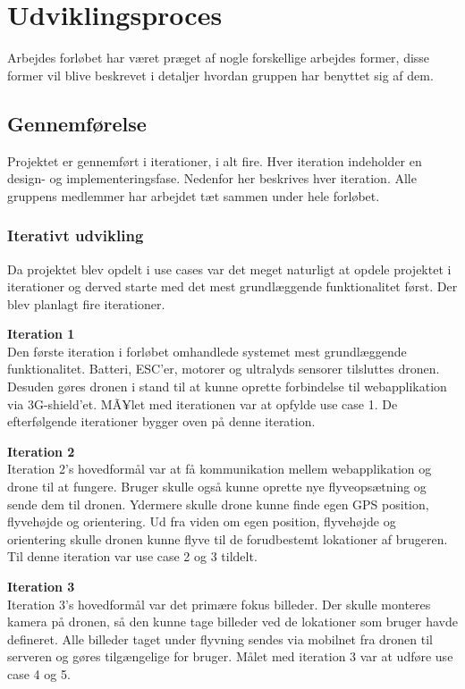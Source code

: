 \chapter{Udviklingsproces}
Arbejdes forløbet har været præget af nogle forskellige arbejdes former, disse former vil blive beskrevet i detaljer hvordan gruppen har benyttet sig af dem.

\section{Gennemførelse}
Projektet er gennemført i iterationer, i alt fire. Hver iteration indeholder en design- og implementeringsfase. Nedenfor her beskrives hver iteration. Alle gruppens medlemmer har arbejdet tæt sammen under hele forløbet.

\subsection{Iterativt udvikling}
Da projektet blev opdelt i use cases var det meget naturligt at opdele projektet i iterationer og derved starte med det mest grundlæggende funktionalitet først. Der blev planlagt fire iterationer. 

\textbf{Iteration 1}\\
Den første iteration i forløbet omhandlede systemet mest grundlæggende funktionalitet. Batteri, ESC'er, motorer og ultralyds sensorer tilsluttes dronen. Desuden gøres dronen i stand til at kunne oprette forbindelse til webapplikation via 3G-shield'et. MÃ¥let med iterationen var at opfylde use case 1. De efterfølgende iterationer bygger oven på denne iteration.

\textbf{Iteration 2}\\
Iteration 2's hovedformål var at få kommunikation mellem webapplikation og drone til at fungere. Bruger skulle også kunne oprette nye flyveopsætning  og sende dem til dronen. Ydermere skulle drone kunne finde egen GPS position, flyvehøjde og orientering. Ud fra viden om egen position, flyvehøjde og orientering skulle dronen kunne flyve til de forudbestemt lokationer af brugeren. Til denne iteration var use case 2 og 3 tildelt.

\textbf{Iteration 3}\\
Iteration 3's hovedformål var det primære fokus billeder. Der skulle monteres kamera på dronen, så den kunne tage billeder ved de lokationer som bruger havde defineret. Alle billeder taget under flyvning sendes via mobilnet fra dronen til serveren og gøres tilgængelige for bruger. Målet med iteration 3 var at udføre use case 4 og 5.

